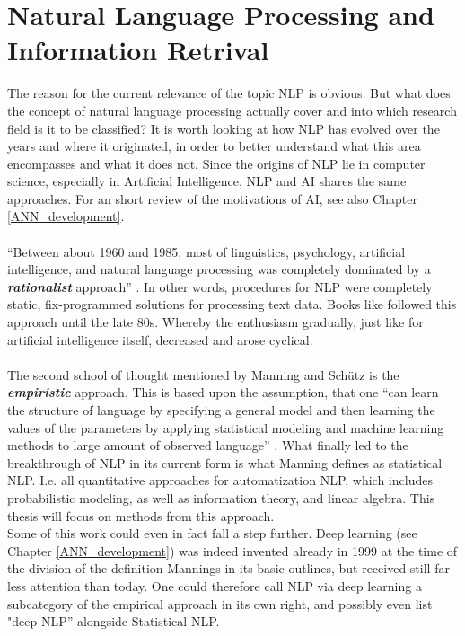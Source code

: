 \documentclass[11pt,a4paper]{article}
\author{Sebastian Knigge}
\begin{document}
\section{Natural Language Processing and Information Retrival}

The reason for the current relevance of the topic NLP is obvious. But what does the concept of natural language processing actually cover and into which research field is it to be classified? It is worth looking at how NLP has evolved over the years and where it originated, in order to better understand what this area encompasses and what it does not. Since the origins of NLP lie in computer science, especially in Artificial Intelligence, NLP and AI shares the same approaches. For an short review of the motivations of AI, see also Chapter \ref{ANN_development}.  \\
\ \\
“Between about 1960 and 1985, most of linguistics, psychology, artificial intelligence, and natural language processing was completely dominated by a \textbf{\textit{rationalist}} approach” \cite[p. 4]{Manning1999}. In other words, procedures for NLP were completely static, fix-programmed solutions for processing text data. Books like \cite{Noble1988} followed this approach until the late 80s. Whereby the enthusiasm gradually, just like for artificial intelligence itself, decreased and arose cyclical.\\
\ \\
The second school of thought mentioned by Manning and Schütz is the \textit{\textbf{empiristic}} approach.
This is based upon the assumption, that one “can learn the structure of language by specifying a general model and then learning the values of the parameters by applying statistical modeling and machine learning methods to large amount of observed language” \cite[p. 253]{Martinez2010}. What finally led to the breakthrough of NLP in its current form is what Manning defines as statistical NLP. I.e. all quantitative approaches for automatization NLP, which includes probabilistic modeling, as well as information theory, and linear algebra. This thesis will focus on methods from this approach.\\
Some of this work could even in fact fall a step further. Deep learning (see Chapter \ref{ANN_development}) was indeed invented already in 1999 at the time of the division of the definition Mannings in its basic outlines, but received still far less attention than today. One could therefore call NLP via deep learning a subcategory of the empirical approach in its own right, and possibly even list "deep NLP” alongside Statistical NLP.\\
\end{document}
